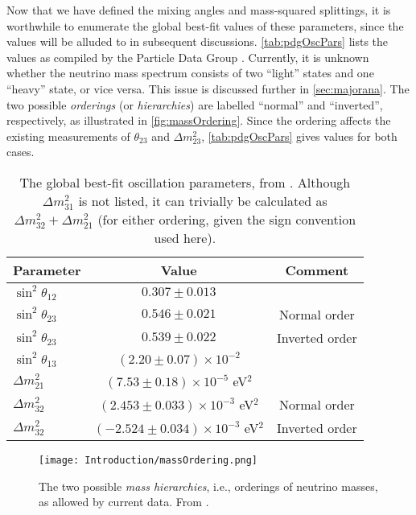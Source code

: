 \documentclass[../thesis.tex]{subfiles}
\begin{document}
Now that we have defined the mixing angles and mass-squared splittings, it is worthwhile to enumerate the global best-fit values of these parameters, since the values will be alluded to in subsequent discussions. \autoref{tab:pdgOscPars} lists the values as compiled by the Particle Data Group \cite{PDG}. Currently, it is unknown whether the neutrino mass spectrum consists of two ``light'' states and one ``heavy'' state, or vice versa. This issue is discussed further in \autoref{sec:majorana}. The two possible \emph{orderings} (or \emph{hierarchies}) are labelled ``normal'' and ``inverted'', respectively, as illustrated in \autoref{fig:massOrdering}. Since the ordering affects the existing measurements of $\theta_{23}$ and $\Delta m^2_{23}$, \autoref{tab:pdgOscPars} gives values for both cases.

\begin{table}[h]
  \begin{tabular}{lcc}
    \toprule
    Parameter & Value & Comment \\
    \midrule
    $\sin^2 \theta_{12}$ & $0.307 \pm 0.013$ & \\
    $\sin^2 \theta_{23}$ & $0.546 \pm 0.021$ & Normal order \\
    $\sin^2 \theta_{23}$ & $0.539 \pm 0.022$ & Inverted order \\
    $\sin^2 \theta_{13}$ & $(2.20 \pm 0.07) \times 10^{-2}$ & \\
    \midrule
    $\Delta m^2_{21}$ & $(7.53 \pm 0.18) \times 10^{-5}$ eV$^2$ & \\
    $\Delta m^2_{32}$ & $(2.453 \pm 0.033) \times 10^{-3}$ eV$^2$ & Normal order \\
    $\Delta m^2_{32}$ & $(-2.524 \pm 0.034) \times 10^{-3}$ eV$^2$ & Inverted order \\
    \bottomrule
  \end{tabular}
  \caption{The global best-fit oscillation parameters, from \cite{PDG}. Although $\Delta m^2_{31}$ is not listed, it can trivially be calculated as $\Delta m^2_{32} + \Delta m^2_{21}$ (for either ordering, given the sign convention used here).}
  \label{tab:pdgOscPars}
\end{table}

\begin{figure}[h]
  \texttt{[image: Introduction/massOrdering.png]}
  \caption{The two possible \emph{mass hierarchies}, i.e., orderings of neutrino masses, as allowed by current data. From \cite{NuPhysWithJUNO}.}
  \label{fig:massOrdering}
\end{figure}
\end{document}
